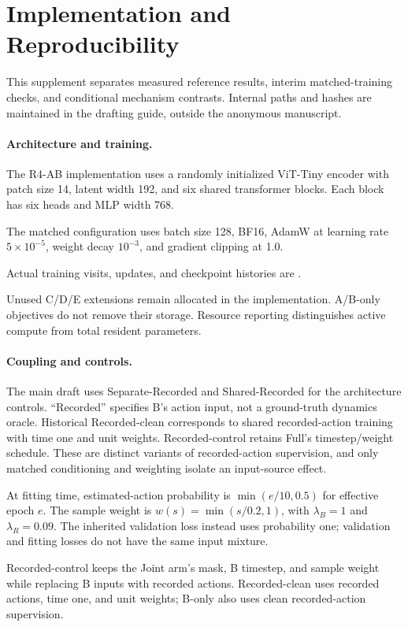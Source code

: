 \section{Implementation and Reproducibility}
\label{app:implementation}
This supplement separates measured reference results, interim matched-training checks, and conditional mechanism contrasts. Internal paths and hashes are maintained in the drafting guide, outside the anonymous manuscript.

\paragraph{Architecture and training.}
The R4-AB implementation uses a randomly initialized ViT-Tiny encoder with patch size 14, latent width 192, and six shared transformer blocks. Each block has six heads and MLP width 768.

The matched configuration uses batch size 128, BF16, AdamW at learning rate $5\times10^{-5}$, weight decay $10^{-3}$, and gradient clipping at 1.0.

Actual training visits, updates, and checkpoint histories are .

Unused C/D/E extensions remain allocated in the implementation. A/B-only objectives do not remove their storage. Resource reporting distinguishes active compute from total resident parameters.

\paragraph{Coupling and controls.}
The main draft uses Separate-Recorded and Shared-Recorded for the architecture controls. ``Recorded'' specifies B's action input, not a ground-truth dynamics oracle. Historical Recorded-clean corresponds to shared recorded-action training with time one and unit weights. Recorded-control retains Full's timestep/weight schedule. These are distinct variants of recorded-action supervision, and only matched conditioning and weighting isolate an input-source effect.

At fitting time, estimated-action probability is $\min(e/10,0.5)$ for effective epoch $e$. The sample weight is $w(s)=\min(s/0.2,1)$, with $\lambda_B=1$ and $\lambda_R=0.09$. The inherited validation loss instead uses probability one; validation and fitting losses do not have the same input mixture.

Recorded-control keeps the Joint arm's mask, B timestep, and sample weight while replacing B inputs with recorded actions. Recorded-clean uses recorded actions, time one, and unit weights; B-only also uses clean recorded-action supervision.

